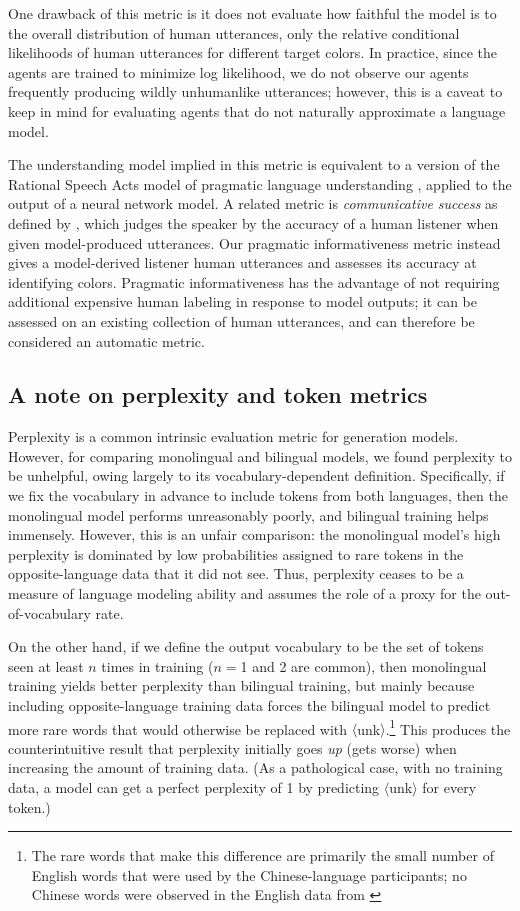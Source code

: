 \documentclass[11pt,a4paper]{article}
\renewcommand{\|}{\mid}
\begin{document}
One drawback of this metric is it does not evaluate how faithful the model is to the overall distribution of human utterances, only the relative conditional likelihoods of human utterances for different target colors. In practice, since the agents are trained to minimize log likelihood, we do not observe our agents frequently producing wildly unhumanlike utterances; however, this is a caveat to keep in mind for evaluating agents that do not naturally approximate a language model.

The understanding model implied in this metric is equivalent to a version of the Rational Speech Acts model of pragmatic language understanding \cite{Frank2012,GoodmanFrank16_RSATiCS}, applied to the output of a neural network model. A related metric is \emph{communicative success} as defined by \citet{Golland2010}, which judges the speaker by the accuracy of a human listener when given model-produced utterances. Our pragmatic informativeness metric instead gives a model-derived listener human utterances and assesses its accuracy at identifying colors. Pragmatic informativeness has the advantage of not requiring additional expensive human labeling in response to model outputs; it can be assessed on an existing collection of human utterances, and can therefore be considered an automatic metric.

\subsection{A note on perplexity and token metrics}

Perplexity is a common intrinsic evaluation metric for generation models. However, for comparing monolingual and bilingual models,
we found perplexity to be
unhelpful, owing largely to its vocabulary-dependent definition. Specifically, if we fix the vocabulary in advance to include tokens
from both languages, then the monolingual model performs
unreasonably poorly, and bilingual training helps immensely. However, this is an unfair comparison: the monolingual model's high perplexity
is dominated by low probabilities assigned to rare tokens in the opposite-language data that it did not see. Thus, perplexity ceases to
be a measure of language modeling ability and assumes the role of a proxy for the out-of-vocabulary rate.

On the other hand, if we define the output vocabulary
to be the set of tokens seen at least $n$ times in training ($n={}$1 and 2 are common), then monolingual training yields
better perplexity than bilingual training, but mainly because including opposite-language training data forces the
bilingual model to predict more rare words that would otherwise be replaced with $\langle$unk$\rangle$.\footnote{The rare
words that make this difference are primarily the small number of English words that were used by the Chinese-language participants;
no Chinese words were observed in the English data from \citet{Monroe2017}} %
This produces the counterintuitive result that perplexity initially goes \emph{up} (gets worse) when increasing the amount of
training data. (As a pathological case, with no training data, a model can get a perfect perplexity
of 1 by predicting $\langle$unk$\rangle$ for every token.)
\end{document}

